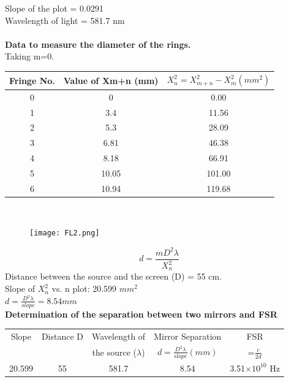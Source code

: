 \documentclass[12pt]{report}
\begin{document}
	Slope of the plot = 0.0291\\
	Wavelength of light = 581.7 nm\\ \\
	\textbf{Data to measure the diameter of the rings.}\\
	Taking m=0.
	\begin{center}
		\begin{tabular}{ |c|c|c| } 
			\hline
			Fringe No.&Value of Xm+n (mm)&$X_n^2 = X_{m+n}^2 - X_m^2(mm^2)$\\
			\hline
			0 & 0     & 0.00   \\
			1 & 3.4   & 11.56  \\
			2 & 5.3   & 28.09  \\
			3 & 6.81  & 46.38  \\
			4 & 8.18  & 66.91  \\
			5 & 10.05 & 101.00 \\
			6 & 10.94 & 119.68 \\                           
			\hline
		\end{tabular}
		\\
	\end{center}
	\begin{figure}[h]
		\centering
		\texttt{[image: FL2.png]}
	\end{figure}
	
	\newpage
	$$d=\frac{mD^2\lambda}{X_n^2}$$
	Distance between the source and the screen (D) = 55 cm.\\
	Slope of $X_n^2$ vs. n plot: 20.599 $mm^2$\\
	$d=\frac{D^2\lambda}{slope} = 8.54 mm$\\
	\textbf{Determination of the separation between two mirrors and FSR}
	\begin{center}
		\begin{tabular}{ |c|c|c|c|c| } 
			\hline
			Slope&Distance D&Wavelength of&Mirror Separation&FSR\\
			&&the source ($\lambda$)&$d=\frac{D^2\lambda}{slope} (mm)$&=$\frac{c}{2d}$\\
			\hline
			20.599 & 55 & 581.7 & 8.54 & 3.51$\times10^{10}$ Hz\\
			\hline
		\end{tabular}
		\\
	\end{center}
	
	
	\newpage
\end{document}
